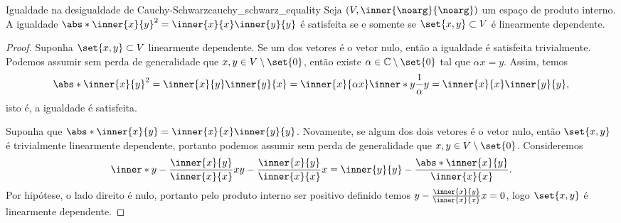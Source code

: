 \begin{lemma}{Igualdade na desigualdade de Cauchy-Schwarz}{cauchy_schwarz_equality}
    Seja \((V, \inner{\noarg}{\noarg})\) um espaço de produto interno. A igualdade \(\abs*{\inner{x}{y}}^2 = \inner{x}{x}\inner{y}{y}\) é satisfeita se e somente se \(\set{x,y} \subset V\) é linearmente dependente.
\end{lemma}
\begin{proof}
    Suponha \(\set{x,y} \subset V\) linearmente dependente. Se um dos vetores é o vetor nulo, então a igualdade é satisfeita trivialmente. Podemos assumir sem perda de generalidade que \(x, y \in V\setminus\set{0}\), então existe \(\alpha \in \mathbb{C}\setminus\set{0}\) tal que \(\alpha x = y\). Assim, temos
    \begin{equation*}
        \abs*{\inner{x}{y}}^2 = \inner{x}{y}\inner{y}{x} = \inner{x}{\alpha x}\inner*{y}{\frac1\alpha y} = \inner{x}{x} \inner{y}{y},
    \end{equation*}
    isto é, a igualdade é satisfeita.

    Suponha que \(\abs*{\inner{x}{y}} = \inner{x}{x} \inner{y}{y}\). Novamente, se algum dos dois vetores é o vetor nulo, então \(\set{x,y}\) é trivialmente linearmente dependente, portanto podemos assumir sem perda de generalidade que \(x, y \in V \setminus\set{0}\). Consideremos
    \begin{equation*}
        \inner*{y - \frac{\inner{x}{y}}{\inner{x}{x}}x}{y - \frac{\inner{x}{y}}{\inner{x}{x}}x} = \inner{y}{y} - \frac{\abs*{\inner{x}{y}}}{\inner{x}{x}}.
    \end{equation*}
    Por hipótese, o lado direito é nulo, portanto pelo produto interno ser positivo definido temos \(y - \frac{\inner{x}{y}}{\inner{x}{x}}x = 0\), logo \(\set{x,y}\) é linearmente dependente.
\end{proof}


